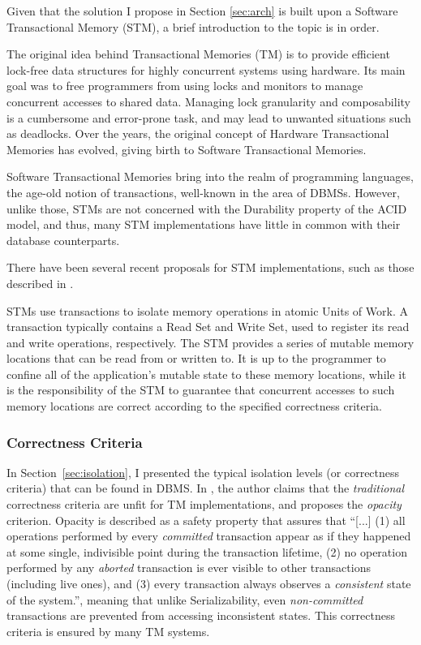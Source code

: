 \documentclass{llncs}
\begin{document}
Given that the solution I propose in Section \ref{sec:arch} is built
upon a Software Transactional Memory (STM), a brief introduction to
the topic is in order.

The original idea behind Transactional Memories (TM) is to provide
efficient lock-free data structures for highly concurrent systems
\cite{herlihy1993transactional} using hardware. Its main goal was to
free programmers from using locks and monitors to manage concurrent
accesses to shared data. Managing lock granularity and composability
is a cumbersome and error-prone task, and may lead to unwanted
situations such as deadlocks. Over the years, the original concept of
Hardware Transactional Memories has evolved, giving birth to Software
Transactional Memories.

Software Transactional Memories bring into the realm of programming
languages, the age-old notion of transactions, well-known in the area
of DBMSs. However, unlike those, STMs are not concerned with the
Durability property of the ACID model, and thus, many STM
implementations have little in common with their database
counterparts.

There have been several recent proposals for STM implementations, such
as those described in \cite{cachopo2006versioned, herlihy2003software,
  marathe2005adaptive, dice2006transactional, riegel2006lazy,
  marathe2006lowering}.

STMs use transactions to isolate memory operations in atomic Units of
Work. A transaction typically contains a Read Set and Write Set, used
to register its read and write operations, respectively. The STM
provides a series of mutable memory locations that can be read from or
written to. It is up to the programmer to confine all of the
application's mutable state to these memory locations, while it is the
responsibility of the STM to guarantee that concurrent accesses to
such memory locations are correct according to the specified
correctness criteria.

\subsubsection{Correctness Criteria}

In Section~\ref{sec:isolation}, I presented the typical isolation
levels (or correctness criteria) that can be found in DBMS. In
\cite{guerraoui2008correctness}, the author claims that the {\it
  traditional} correctness criteria are unfit for TM implementations,
and proposes the {\it opacity} criterion. Opacity is described as a
safety property that assures that ``[...] (1) all operations performed
by every {\it committed} transaction appear as if they happened at
some single, indivisible point during the transaction lifetime, (2) no
operation performed by any {\it aborted} transaction is ever visible
to other transactions (including live ones), and (3) every transaction
always observes a {\it consistent} state of the system.'', meaning
that unlike Serializability, even {\it non-committed} transactions are
prevented from accessing inconsistent states. This correctness
criteria is ensured by many TM systems.
\end{document}
